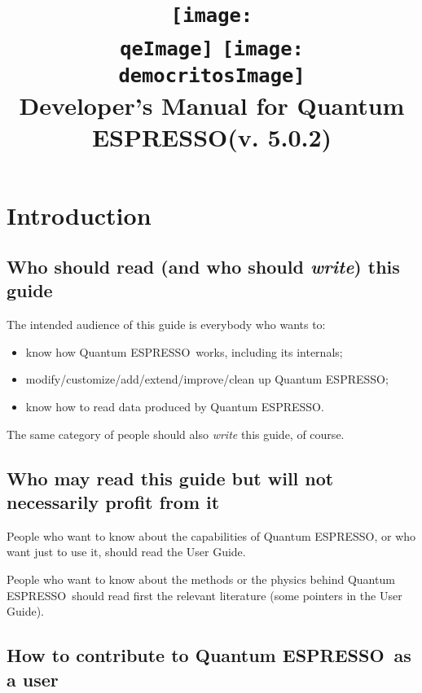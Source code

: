 \documentclass[12pt,a4paper]{article}
\def\version{5.0.2}
\def\qe{{\sc Quantum ESPRESSO}}
\def\qeImage{quantum_espresso.pdf}
\def\democritosImage{democritos.pdf}
\def\qeImage{quantum_espresso.png}
\def\democritosImage{democritos.png}
\begin{document}
 
\author{}
\date{}
\title{
  \texttt{[image: \\qeImage]} \hskip 2cm
  \texttt{[image: \\democritosImage]}\\
  \vskip 1cm
  \Huge Developer's Manual for \qe (v. \version) \smallskip
}
\maketitle

\tableofcontents

\section{Introduction}

\subsection{Who should read (and who should {\em write}) this guide}

The intended audience of this guide is everybody who wants to:
\begin{itemize}
\item know how \qe\ works, including its internals;
\item modify/customize/add/extend/improve/clean up \qe;
\item know how to read data produced by \qe.
\end{itemize}
The same category of people should also {\em write} this guide, of course.

\subsection{Who may read this guide but will not necessarily profit from it}

People who want to know about the capabilities of \qe,
or who want just to use it, should read the User Guide.

People who want to know about the methods or the physics
behind \qe\ should read first the relevant  
literature (some pointers in the User Guide).

\subsection{How to contribute to \qe\ as a user}
\end{document}
